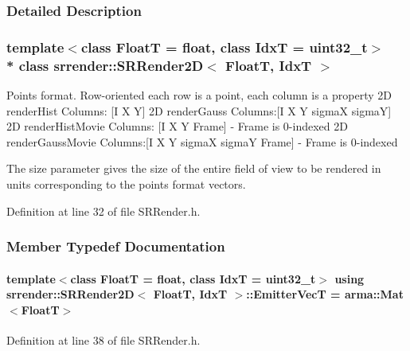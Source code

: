 \subsubsection{Detailed Description}
\subsubsection*{template$<$class FloatT = float, class IdxT = uint32\+\_\+t$>$\\*
class srrender\+::\+S\+R\+Render2\+D$<$ Float\+T, Idx\+T $>$}

Points format. Row-\/oriented each row is a point, each column is a property 2D render\+Hist Columns\+: \mbox{[}I X Y\mbox{]} 2D render\+Gauss Columns\+:\mbox{[}I X Y sigmaX sigmaY\mbox{]} 2D render\+Hist\+Movie Columns\+: \mbox{[}I X Y Frame\mbox{]} -\/ Frame is 0-\/indexed 2D render\+Gauss\+Movie Columns\+:\mbox{[}I X Y sigmaX sigmaY Frame\mbox{]} -\/ Frame is 0-\/indexed

The \textquotesingle{}size\textquotesingle{} parameter gives the size of the entire field of view to be rendered in units corresponding to the points format vectors. 

Definition at line 32 of file S\+R\+Render.\+h.



\subsubsection{Member Typedef Documentation}
\paragraph[{\texorpdfstring{Emitter\+VecT}{EmitterVecT}}]{\setlength{\rightskip}{0pt plus 5cm}template$<$class FloatT  = float, class IdxT  = uint32\+\_\+t$>$ using {\bf srrender\+::\+S\+R\+Render2D}$<$ FloatT, IdxT $>$\+::{\bf Emitter\+VecT} =  arma\+::\+Mat$<$FloatT$>$}\hypertarget{classsrrender_1_1SRRender2D_ac2433ed86b4b21ff082ba8c2a080e26a}{}\label{classsrrender_1_1SRRender2D_ac2433ed86b4b21ff082ba8c2a080e26a}


Definition at line 38 of file S\+R\+Render.\+h.

